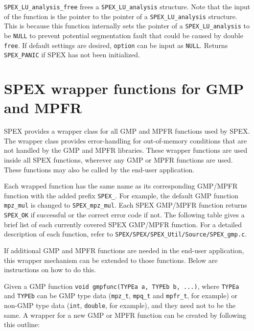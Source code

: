 \documentclass[12pt]{report}
\theoremstyle{definition}
\begin{document}
\verb|SPEX_LU_analysis_free| frees a \verb|SPEX_LU_analysis| structure.
Note that the input of the function is the pointer to the pointer of a
\verb|SPEX_LU_analysis| structure. This is because this function internally
sets the pointer of a \verb|SPEX_LU_analysis| to be \verb|NULL| to prevent
potential segmentation fault that could be caused by double \verb|free|.
If default settings are desired, \verb|option| can be input as \verb|NULL|.
Returns \verb|SPEX_PANIC| if SPEX has not been initialized.

\section{SPEX wrapper functions for GMP and MPFR}

SPEX provides a wrapper class for all GMP and MPFR functions used by SPEX.
The wrapper class provides error-handling for out-of-memory conditions
that are not handled by the GMP and MPFR libraries.  These wrapper functions
are used inside all SPEX functions, wherever any GMP or MPFR functions are
used.  These functions may also be called by the end-user application.

Each wrapped function has the same name as its corresponding GMP/MPFR function
with the added prefix \verb|SPEX_|. For example, the default GMP function
\verb|mpz_mul| is changed to \verb|SPEX_mpz_mul|. Each SPEX GMP/MPFR function
returns \verb|SPEX_OK| if successful or the correct error code if not. The
following table gives a brief list of each currently covered SPEX GMP/MPFR
function. For a detailed description of each function, refer to
\verb|SPEX/SPEX/SPEX_Util/Source/SPEX_gmp.c|.

If additional GMP and MPFR functions are needed in the end-user application,
this wrapper mechanism can be extended to those functions.  Below are
instructions on how to do this.

Given a GMP function \verb|void gmpfunc(TYPEa a, TYPEb b, ...)|, where
\verb|TYPEa| and \verb|TYPEb| can be GMP type data (\verb|mpz_t|,
\verb|mpq_t| and \verb|mpfr_t|, for example) or non-GMP type data (\verb|int|,
\verb|double|, for example), and they need not to be the same.
A wrapper for a new GMP or MPFR function can be created by following
this outline:
\end{document}
